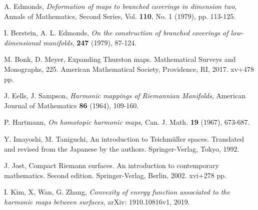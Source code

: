 \documentclass[11pt]{amsart}
\numberwithin{equation}{section}
\theoremstyle{plain}
\theoremstyle{definition}
\theoremstyle{definition}
\begin{document}
\begin{thebibliography}{99}
A. Edmonds, {\it Deformation of maps to branched coverings in dimension two}, Annals of Mathematics, Second Series, Vol. {\bf 110}, No. 1 (1979), pp. 113-125.




 	I. Berstein, A. L. Edmonds, {\it On the construction of branched coverings of low-dimensional manifolds}, {\bf 247} (1979), 87-124.

 M. Bonk, D. Meyer,  Expanding Thurston maps. Mathematical Surveys and Monographs, 225. American Mathematical Society, Providence, RI, 2017. xv+478 pp. 


 J. Eells, J. Sampson, {\it Harmonic mappings of Riemannian Manifolds}, American Journal of Mathematics {\bf 86} (1964), 109-160.

 P. Hartmann, {\it On homotopic harmonic maps}, Can. J. Math. {\bf 19} (1967), 673-687.

 Y. Imayoshi, M.  Taniguchi, An introduction to Teichm\"uller spaces. Translated and revised from the Japanese by the authors. Springer-Verlag, Tokyo, 1992. 

 J. Jost, Compact Riemann surfaces. An introduction to contemporary mathematics. Second edition. Springer-Verlag, Berlin, 2002. xvi+278 pp.


 I. Kim, X, Wan, G. Zhang, {\it Convexity of energy function associated to the harmonic maps between surfaces},  arXiv: 1910.10816v1, 2019. 






\end{thebibliography}
\end{document}
